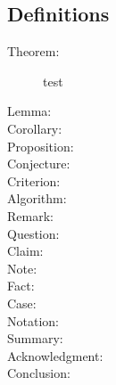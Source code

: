 \subsection{Definitions}
\begin{description}
%
\item[Theorem:]{test} 
\item[Lemma:]   
\item[Corollary:]  
\item[Proposition:]  
\item[Conjecture:]
\item[Criterion:]
\item[Algorithm:]
\item[Remark:]
\item[Question:]
\item[Claim:]
\item[Note:]
\item[Fact:]
\item[Case:]
\item[Notation:]
\item[Summary:]
\item[Acknowledgment:]
\item[Conclusion:]
\end{description}
%
%
